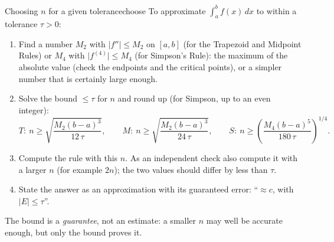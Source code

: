 \documentclass[11pt]{article}
\begin{document}
\begin{proc}{Choosing $n$ for a given tolerance}{choose}
To approximate $\int_a^bf(x)\,dx$ to within a tolerance $\tau>0$:
\begin{enumerate}[label=\arabic*.,leftmargin=*]
  \item Find a number $M_2$ with $\lvert f''\rvert\le M_2$ on $[a,b]$ (for the Trapezoid and Midpoint Rules) or $M_4$ with $\lvert f^{(4)}\rvert\le M_4$ (for Simpson's Rule): the maximum of the absolute value (check the endpoints and the critical points), or a simpler number that is certainly large enough.
  \item Solve the bound $\le\tau$ for $n$ and round up (for Simpson, up to an even integer):
  \[T:\ n\ge\sqrt{\frac{M_2(b-a)^3}{12\,\tau}},\qquad M:\ n\ge\sqrt{\frac{M_2(b-a)^3}{24\,\tau}},\qquad S:\ n\ge\left(\frac{M_4(b-a)^5}{180\,\tau}\right)^{1/4}.\]
  \item Compute the rule with this $n$. As an independent check also compute it with a larger $n$ (for example $2n$); the two values should differ by less than $\tau$.
  \item State the answer as an approximation with its guaranteed error: ``$\approx c$, with $\lvert E\rvert\le\tau$''.
\end{enumerate}
The bound is a \emph{guarantee}, not an estimate: a smaller $n$ may well be accurate enough, but only the bound proves it.
\end{proc}
\end{document}
